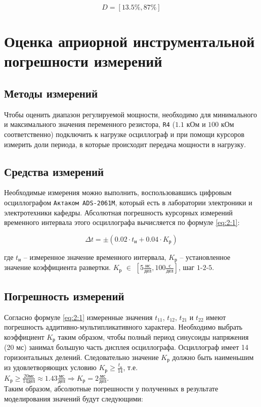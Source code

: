 \begin{displaymath}
	D = [13.5\%, 87\%]
\end{displaymath}

\section{Оценка априорной инструментальной погрешности измерений}

\subsection{Методы измерений}

Чтобы оценить диапазон регулируемой мощности, необходимо для минимального и максимального значения переменного резистора, \verb+R4+ ($1.1$ кОм и $100$ кОм соответственно) подключить к нагрузке осциллограф и при помощи курсоров измерить доли периода, в которые происходит передача мощности в нагрузку.

\subsection{Средства измерений}

Необходимые измерения можно выполнить, воспользовавшись цифровым осциллографом \verb+Актаком ADS-2061M+, который есть в лаборатории электроники и электротехники кафедры. Абсолютная погрешность курсорных измерений временного интервала этого осциллографа вычисляется по формуле \ref{eq:2:1}:

\begin{equation}
\label{eq:2:1}
	\Delta t = \pm \left(0.02 \cdot t_{\text{и}} + 0.04 \cdot K_{\text{р}} \right)
\end{equation}

\noindent где $t_{\text{и}}$ -- измеренное значение временного интервала, $K_{\text{р}}$ -- установленное значение коэффициента развертки. $K_{\text{р}}$ $\in$ $\left[5 \frac{\text{нс}}{\text{дел}} , 100 \frac{\text{с}}{\text{дел}}\right]$, шаг $1$-$2$-$5$.

\subsection{Погрешность измерений}

Согласно формуле \ref{eq:2:1} измеренные значения $t_{11}$, $t_{12}$, $t_{21}$ и $t_{22}$ имеют погрешность аддитивно-мультипликативного характера. Необходимо выбрать коэффициент $K_{\text{р}}$ таким образом, чтобы полный период синусоиды напряжения (20 мс) занимал большую часть дисплея осциллографа. Осциллограф имеет 14 горизонтальных делений. Следовательно значение $K_{\text{р}}$ должно быть наименьшим из удовлетворяющих условию $K_{\text{р}} \geq \frac{t_{\text{и}}}{14}$, т.е.\\\noindent $K_{\text{р}} \geq \frac{20 \text{мс}}{14 \text{дел}} \approx 1.43 \frac{\text{мс}}{\text{дел}} \Rightarrow K_{\text{р}} = 2 \frac{\text{мс}}{\text{дел}}$.\\\noindent Таким образом, абсолютные погрешности у полученных в результате моделирования значений будут следующими:

